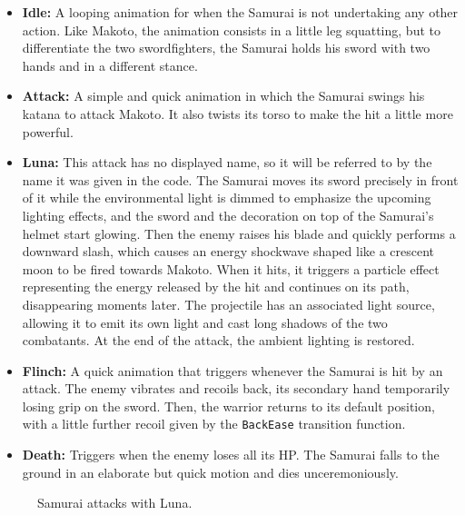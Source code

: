 \begin{itemize}
    \item \textbf{Idle:} A looping animation for when the Samurai is not undertaking any other action. Like Makoto, the animation consists in a little leg squatting, but to differentiate the two swordfighters, the Samurai holds his sword with two hands and in a different stance.
    
    \item \textbf{Attack:} A simple and quick animation in which the Samurai swings his katana to attack Makoto. It also twists its torso to make the hit a little more powerful.
    
    \item \textbf{Luna:} This attack has no displayed name, so it will be referred to by the name it was given in the code. The Samurai moves its sword precisely in front of it while the environmental light is dimmed to emphasize the upcoming lighting effects, and the sword and the decoration on top of the Samurai's helmet start glowing. Then the enemy raises his blade and quickly performs a downward slash, which causes an energy shockwave shaped like a crescent moon to be fired towards Makoto. When it hits, it triggers a particle effect representing the energy released by the hit and continues on its path, disappearing moments later. The projectile has an associated light source, allowing it to emit its own light and cast long shadows of the two combatants. At the end of the attack, the ambient lighting is restored.
    
    \item \textbf{Flinch:} A quick animation that triggers whenever the Samurai is hit by an attack. The enemy vibrates and recoils back, its secondary hand temporarily losing grip on the sword. Then, the warrior returns to its default position, with a little further recoil given by the \texttt{BackEase} transition function.
    
    \item \textbf{Death:} Triggers when the enemy loses all its HP. The Samurai falls to the ground in an elaborate but quick motion and dies unceremoniously.

\end{itemize}

\begin{figure}[H]
    \centering
    \caption{Samurai attacks with Luna.}
    \label{fig:luna}
\end{figure}



